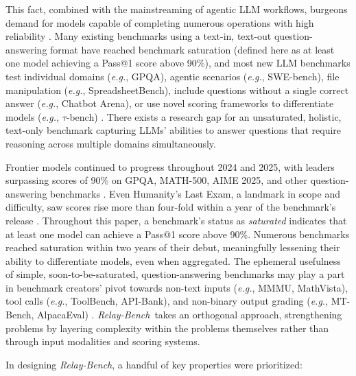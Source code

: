 \documentclass[10pt,letterpaper,twocolumn]{article}
\newcommand{\relaybench}{\texorpdfstring{{\textit{Relay-Bench}}}{Relay-Bench}}
\begin{document}
This fact, combined with the mainstreaming of agentic LLM workflows, burgeons demand for models capable of completing numerous operations with high reliability \cite{map-paper}.
Many existing benchmarks using a text-in, text-out question-answering format have reached benchmark saturation (defined here as at least one model achieving a Pass@1 score above 90\%), and most new LLM benchmarks test individual domains (\textit{e.g.}, GPQA), agentic scenarios (\textit{e.g.}, SWE-bench), file manipulation (\textit{e.g.}, SpreadsheetBench), include questions without a single correct answer (\textit{e.g.}, Chatbot Arena), or use novel scoring frameworks to differentiate models (\textit{e.g.}, $\tau$-bench) \cite{gpqa-paper,swe-bench,spreadsheetbench,chatbot-arena,tau-bench}.
There exists a research gap for an unsaturated, holistic, text-only benchmark capturing LLMs' abilities to answer questions that require reasoning across multiple domains simultaneously.

Frontier models continued to progress throughout 2024 and 2025, with leaders surpassing scores of 90\% on GPQA, MATH-500, AIME 2025, and other question-answering benchmarks \cite{gpqa-scores,math500-site,aime2025-site}. Even Humanity's Last Exam, a landmark in scope and difficulty, saw scores rise more than four-fold within a year of the benchmark's release \cite{lastexamleaderboardwithdatesando1}. Throughout this paper, a benchmark's status as \textit{saturated} indicates that at least one model can achieve a Pass@1 score above 90\%. Numerous benchmarks reached saturation within two years of their debut, meaningfully lessening their ability to differentiate models, even when aggregated.
The ephemeral usefulness of simple, soon-to-be-saturated, question-answering benchmarks may play a part in benchmark creators' pivot towards non-text inputs (\textit{e.g.}, MMMU, MathVista), tool calls (\textit{e.g.}, ToolBench, API-Bank), and non-binary output grading (\textit{e.g.}, MT-Bench, AlpacaEval) \cite{mmmu,mathvista,toolbench,api-bank,mt-bench,alpacaeval}. \relaybench\ takes an orthogonal approach, strengthening problems by layering complexity within the problems themselves rather than through input modalities and scoring systems.

In designing \relaybench, a handful of key properties were prioritized:
\end{document}

